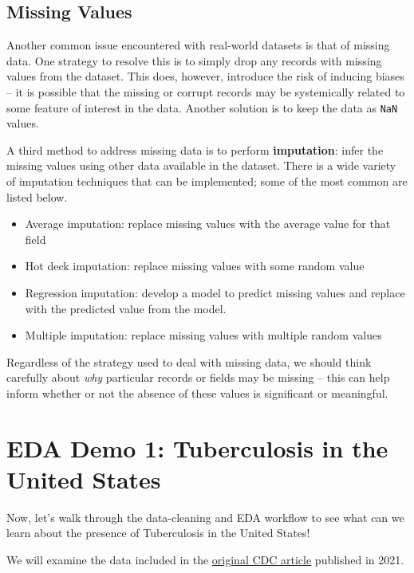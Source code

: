 \documentclass[
  letterpaper,
  DIV=11,
  numbers=noendperiod]{scrreprt}
\providecommand{\tightlist}{%
  \setlength{\itemsep}{0pt}\setlength{\parskip}{0pt}}\usepackage{longtable,booktabs,array}
\begin{document}
\hypertarget{missing-values}{%
\subsection{Missing Values}\label{missing-values}}

Another common issue encountered with real-world datasets is that of
missing data. One strategy to resolve this is to simply drop any records
with missing values from the dataset. This does, however, introduce the
risk of inducing biases -- it is possible that the missing or corrupt
records may be systemically related to some feature of interest in the
data. Another solution is to keep the data as \texttt{NaN} values.

A third method to address missing data is to perform
\textbf{imputation}: infer the missing values using other data available
in the dataset. There is a wide variety of imputation techniques that
can be implemented; some of the most common are listed below.

\begin{itemize}
\tightlist
\item
  Average imputation: replace missing values with the average value for
  that field
\item
  Hot deck imputation: replace missing values with some random value
\item
  Regression imputation: develop a model to predict missing values and
  replace with the predicted value from the model.
\item
  Multiple imputation: replace missing values with multiple random
  values
\end{itemize}

Regardless of the strategy used to deal with missing data, we should
think carefully about \emph{why} particular records or fields may be
missing -- this can help inform whether or not the absence of these
values is significant or meaningful.

\hypertarget{eda-demo-1-tuberculosis-in-the-united-states}{%
\section{EDA Demo 1: Tuberculosis in the United
States}\label{eda-demo-1-tuberculosis-in-the-united-states}}

Now, let's walk through the data-cleaning and EDA workflow to see what
can we learn about the presence of Tuberculosis in the United States!

We will examine the data included in the
\href{https://www.cdc.gov/mmwr/volumes/71/wr/mm7112a1.htm?s_cid=mm7112a1_w\#T1_down}{original
CDC article} published in 2021.
\end{document}
